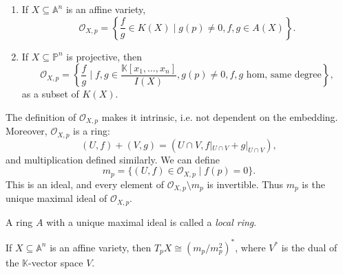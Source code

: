 \documentclass[12pt]{article}
\begin{document}
\begin{exbox}
	\begin{enumerate}
		\item If $X \subseteq \mathbb{A}^n$ is an affine variety,
			\[
				\mathcal{O}_{X, p} = \left\{ \frac{f}{g} \in K(X) \mid g(p) \neq 0, f, g \in A(X)\right\}.
			\]
			\item If $X \subseteq \mathbb{P}^n$ is projective, then
			\[
				\mathcal{O}_{X, p} = \left\{ \frac{f}{g} \mid f, g \in \frac{\mathbb{K}[x_1, \ldots, x_n]}{I(X)}, g(p) \neq 0, f, g \text{ hom, same degree}\right\},
			\]
			as a subset of $K(X)$.
	\end{enumerate}
\end{exbox}

\begin{remark}
	The definition of $\mathcal{O}_{X, p}$ makes it intrinsic, i.e. not dependent on the embedding. Moreover, $\mathcal{O}_{X, p}$ is a ring:
	\[
		(U, f) + (V, g) = (U \cap V, f|_{U \cap V} + g|_{U \cap V}),
	\]
	and multiplication defined similarly. We can define
	\[
		m_p = \{ (U, f) \in \mathcal{O}_{X, p} \mid f(p) = 0\}.
	\]
	This is an ideal, and every element of $\mathcal{O}_{X, p} \setminus m_p$ is invertible. Thus $m_p$ is the unique maximal ideal of $\mathcal{O}_{X, p}$.
\end{remark}

\begin{definition}
	A ring $A$ with a unique maximal ideal is called a \emph{local ring}.
\end{definition}

\begin{theorem}
	If $X \subseteq \mathbb{A}^n$ is an affine variety, then $T_p X \cong (m_p / m_p^2)^\ast$, where $V^\ast$ is the dual of the $\mathbb{K}$-vector space $V$.
\end{theorem}
\end{document}
